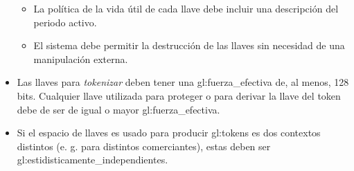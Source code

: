 \begin{itemize}
\begin{itemize}
    \item La política de la vida útil de cada llave debe incluir una
      descripción del periodo activo.

    \item El sistema debe permitir la destrucción de las llaves sin necesidad
      de una manipulación externa.

  \end{itemize}

  \item Las llaves para \textit{tokenizar} deben tener una
    \gls{gl:fuerza_efectiva} de, al menos, 128 bits. Cualquier llave utilizada
    para proteger o para derivar la llave del token debe de ser de igual o
    mayor \gls{gl:fuerza_efectiva}.

  \item Si el espacio de llaves es usado para producir \glspl{gl:token} es dos
    contextos distintos (e. g. para distintos comerciantes), estas deben ser
    \glspl{gl:estidisticamente_independiente}.

\end{itemize}
